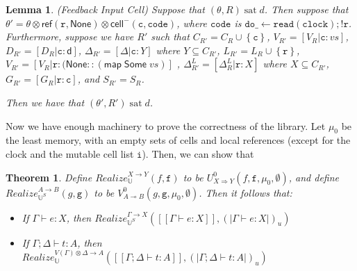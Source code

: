 \documentclass[nocopyrightspace,preprint]{sigplanconf}
\newcommand{\ultrametric}{\mathbb{U}}
\newcommand{\setof}[1]{\left\{{#1}\right\}}
\newcommand{\term}[1]{\ensuremath{\mathtt{{#1}}}}
\newcommand{\To}{\Rightarrow}
\newcommand{\interp}[1]{[\![{#1}]\!]}
\newcommand{\interpu}[1]{(\!|{#1}|\!)_u}
\newcommand{\realize}[5]{\mathit{Realize}_{#1}^{#2 \to #3}({#4}, {#5})}
\newcommand{\lolli}{\multimap}
\newcommand{\None}{\mathsf{None}}
\newcommand{\cellminus}[2]{\mathsf{cell}^{-}({#1}, {#2})}
\newcommand{\judgeu}[3]{{#1} \vdash {#2} : {#3}}
\newcommand{\judgek}[4][\Gamma]{{#1};{#2} \vdash {#3} : {#4}}
\newcommand{\D}{\mathsf{d}}
\newcommand{\satisfy}[2]{{#1}\;\mathrm{sat}\;{#2}}
\newtheorem{lemma}{Lemma}
\newtheorem{theorem}{Theorem}
\begin{document}
\begin{lemma}{(Feedback Input Cell)}
Suppose that $\satisfy{(\theta, R)}{d}$. Then suppose that $\theta' =
\theta \otimes \mathsf{ref}(\term{r,\None}) \otimes \cellminus{\term{c}}{\term{code}}$, where
\term{code} is $\term{do \_ \leftarrow read(clock); !r}$. Furthermore, suppose we
have $R'$ such that 
 $C_{R'} = C_R \cup \setof{\term{c}}$,
 $V_{R'} = [V_R|\term{c}:vs]$,
 $D_{R'} = [D_R|\term{c}:\D]$,
 $\Delta_{R'} = [\Delta|\term{c}:Y]$ where $Y \subseteq C_{R'}$,
 $L_{R'} = L_R \cup \setof{\term{r}}$,
 $V_{R'} = [V_R|\term{r}:(\None :: (\mathsf{map\;Some}\;vs)]$ ,
 $\Delta^L_{R'} = [\Delta^L_R|\term{r}:X]$ where $X \subseteq C_{R'}$,
 $G_{R'} = [G_R|\term{r}:\term{c}]$, and
 $S_{R'} = S_R$.

Then we have that $\satisfy{(\theta', R')}{d}$. 
\end{lemma}
\noindent Now we have enough machinery to prove the correctness of the library.
Let $\mu_0$ be the least memory, with an empty sets of cells and local
references (except for the clock and the mutable cell list \term{i}). Then,
we can show that
\begin{theorem}
Define $\realize{\ultrametric}{X}{Y}{f}{\term{f}}$ to be $U^0_{X \To
  Y}(f, \term{f}, \mu_0, \emptyset)$, and define
$\realize{\ultrametric^S}{A}{B}{g}{\term{g}}$ to be $V^0_{A \lolli
  B}(g, \term{g}, \mu_0, \emptyset)$. 
Then it follows that:
\begin{itemize}
\item If $\judgeu{\Gamma}{e}{X}$, then $\realize{\ultrametric^S}{\Gamma}{X}{\interp{\judgeu{\Gamma}{e}{X}}}{\interpu{\judgeu{\Gamma}{e}{X}}}$
\item If $\judgek{\Delta}{t}{A}$, then \\
$\realize{\ultrametric}{V(\Gamma) \otimes \Delta}{A}{\interp{\judgek{\Delta}{t}{A}}}{\interpu{\judgek{\Delta}{t}{A}}}$
\end{itemize}
\end{theorem}
\end{document}
